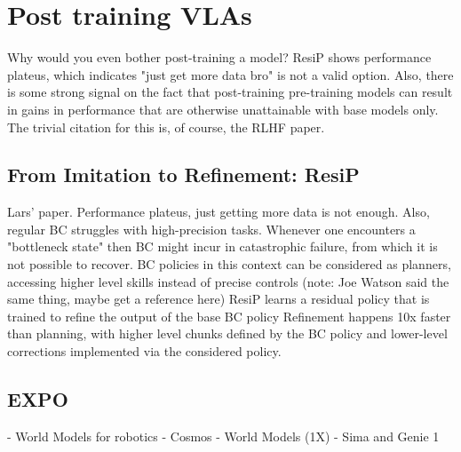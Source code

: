 \section{Post training VLAs}
Why would you even bother post-training a model? 
ResiP shows performance plateus, which indicates "just get more data bro" is not a valid option.
Also, there is some strong signal on the fact that post-training pre-training models can result in gains in performance that are otherwise unattainable with base models only.
The trivial citation for this is, of course, the RLHF paper.

\subsection{From Imitation to Refinement: ResiP}
Lars' paper.
Performance plateus, just getting more data is not enough.
Also, regular BC struggles with high-precision tasks.
Whenever one encounters a "bottleneck state" then BC might incur in catastrophic failure, from which it is not possible to recover.
BC policies in this context can be considered as planners, accessing higher level skills instead of precise controls (note: Joe Watson said the same thing, maybe get a reference here)
ResiP learns a residual policy that is trained to refine the output of the base BC policy
Refinement happens 10x faster than planning, with higher level chunks defined by the BC policy and lower-level corrections implemented via the considered policy.




\subsection{EXPO}

- World Models for robotics
    - Cosmos
    - World Models (1X)
    - Sima and Genie 1
